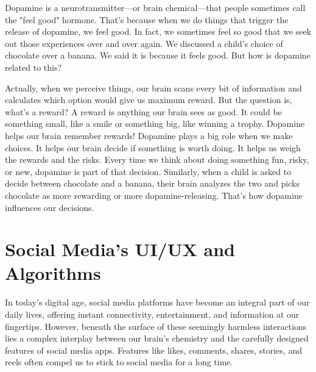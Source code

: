\documentclass[a4paper,10pt,twocolumn]{memoir}
\begin{document}
Dopamine is a neurotransmitter—or brain chemical—that people sometimes call the "feel good" hormone. That's because when we do things that trigger the release of dopamine, we feel good. In fact, we sometimes feel so good that we seek out those experiences over and over again. We discussed a child’s choice of chocolate over a banana. We said it is because it feels good. But how is dopamine related to this?

Actually, when we perceive things, our brain scans every bit of information and calculates which option would give us maximum reward. But the question is, what’s a reward? A reward is anything our brain sees as good. It could be something small, like a smile or something big, like winning a trophy. Dopamine helps our brain remember rewards! Dopamine plays a big role when we make choices. It helps our brain decide if something is worth doing. It helps us weigh the rewards and the risks. Every time we think about doing something fun, risky, or new, dopamine is part of that decision. Similarly, when a child is asked to decide between chocolate and a banana, their brain analyzes the two and picks chocolate as more rewarding or more dopamine-releasing. That’s how dopamine influences our decisions.

\section*{Social Media’s UI/UX and Algorithms}

In today’s digital age, social media platforms have become an integral part of our daily lives, offering instant connectivity, entertainment, and information at our fingertips. However, beneath the surface of these seemingly harmless interactions lies a complex interplay between our brain’s chemistry and the carefully designed features of social media apps. Features like likes, comments, shares, stories, and reels often compel us to stick to social media for a long time.

\end{document}
